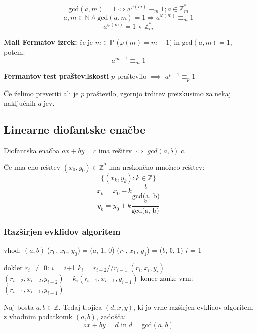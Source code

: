 \begin{multicols}{5}
\[\textrm{gcd}(a, m) = 1 \Leftrightarrow a^{\varphi(m)} \equiv_m 1; a \in \mathbb{Z}_m^*\]
\[a,m \in \mathbb{N} \wedge \textrm{gcd}(a, m) = 1 \Rightarrow a^{\varphi(m)} \equiv_m 1\]
\[a^{\varphi(m)} = 1 \text{ v } \mathbb{Z}_m^*\]

\textbf{Mali Fermatov izrek:} če je $m \in \mathbb{P}$ ($\varphi(m) = m-1$) in $\textrm{gcd}(a,m) = 1$, potem:
\[a^{m-1} \equiv_m 1\]

\textbf{Fermantov test praštevilskosti}
$p$ praštevilo $\implies$ $a^{p-1} \equiv_p 1$

Če želimo preveriti ali je $p$ praštevilo, zgornjo trditev preizkusimo za nekaj naključnih $a$-jev.

\subsection{Linearne diofantske enačbe}
Diofantska enačba $ax + by = c$ ima rešitev $\Leftrightarrow$ $gcd(a, b) | c$. 

Če ima eno rešitev $(x_0, y_0) \in \mathbb{Z}^2$ ima neskončno množico rešitev:
\[\{(x_k, y_k) : k \in \mathbb{Z}\}\]
\[x_k = x_0 - k\frac{b}{\textrm{gcd(a, b)}}\]
\[y_k = y_0 + k\frac{a}{\textrm{gcd(a, b)}}\]

\subsubsection*{Razširjen evklidov algoritem}

\begin{koda}
vhod: $(a, b)$
($r_0$, $x_0$, $y_0$) = ($a$, 1, 0)
($r_1$, $x_1$, $y_1$) = ($b$, 0, 1)
$i$ = 1

dokler $r_i$ $\neq$ 0:
    $i$ = $i$+1
    $k_i$ = $r_{i-2} // r_{i-1}$
    $(r_i, x_i, y_i)$ = $(r_{i-2}, x_{i-2}, y_{i-2}) - k_i(r_{i-1}, x_{i-1}, y_{i-1})$
konec zanke
vrni: $(r_{i-1}, x_{i-1}, y_{i-1})$
\end{koda}

Naj bosta $a, b \in \mathbb{Z}$. Tedaj trojica $(d, x, y)$, ki jo vrne razširjen evklidov algoritem z vhodnim podatkomk $(a, b)$, zadošča:
\[ax + by = d \text{ in } d = \textrm{gcd}(a, b)\] 



\end{multicols}
